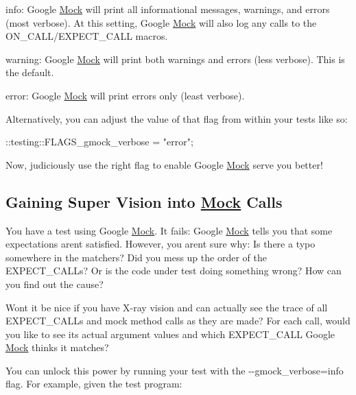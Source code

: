 \begin{DoxyItemize}
\item {\ttfamily info}\+: Google \hyperlink{classMock}{Mock} will print all informational messages, warnings, and errors (most verbose). At this setting, Google \hyperlink{classMock}{Mock} will also log any calls to the {\ttfamily O\+N\+\_\+\+C\+A\+L\+L/\+E\+X\+P\+E\+C\+T\+\_\+\+C\+A\+LL} macros.
\item {\ttfamily warning}\+: Google \hyperlink{classMock}{Mock} will print both warnings and errors (less verbose). This is the default.
\item {\ttfamily error}\+: Google \hyperlink{classMock}{Mock} will print errors only (least verbose).
\end{DoxyItemize}

Alternatively, you can adjust the value of that flag from within your tests like so\+:


\begin{DoxyCode}
::testing::FLAGS\_gmock\_verbose = \textcolor{stringliteral}{"error"};
\end{DoxyCode}


Now, judiciously use the right flag to enable Google \hyperlink{classMock}{Mock} serve you better!

\subsection*{Gaining Super Vision into \hyperlink{classMock}{Mock} Calls}

You have a test using Google \hyperlink{classMock}{Mock}. It fails\+: Google \hyperlink{classMock}{Mock} tells you that some expectations aren\textquotesingle{}t satisfied. However, you aren\textquotesingle{}t sure why\+: Is there a typo somewhere in the matchers? Did you mess up the order of the {\ttfamily E\+X\+P\+E\+C\+T\+\_\+\+C\+A\+LL}s? Or is the code under test doing something wrong? How can you find out the cause?

Won\textquotesingle{}t it be nice if you have X-\/ray vision and can actually see the trace of all {\ttfamily E\+X\+P\+E\+C\+T\+\_\+\+C\+A\+LL}s and mock method calls as they are made? For each call, would you like to see its actual argument values and which {\ttfamily E\+X\+P\+E\+C\+T\+\_\+\+C\+A\+LL} Google \hyperlink{classMock}{Mock} thinks it matches?

You can unlock this power by running your test with the {\ttfamily -\/-\/gmock\+\_\+verbose=info} flag. For example, given the test program\+:


